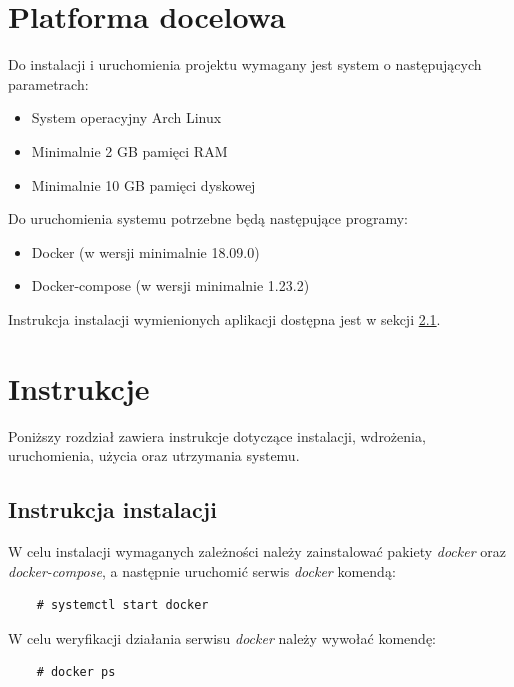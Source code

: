 \documentclass[a4paper,11pt,twoside]{report}
\theoremstyle{definition}
\begin{document}
    \section{Platforma docelowa}
        Do instalacji i uruchomienia projektu wymagany jest system o następujących parametrach:
        
        \begin{itemize}
            \item System operacyjny Arch Linux 
            \item Minimalnie 2 GB pamięci RAM
            \item Minimalnie 10 GB pamięci dyskowej
        \end{itemize}
        
        Do uruchomienia systemu potrzebne będą następujące programy:
        
        \begin{itemize}
            \item Docker (w wersji minimalnie 18.09.0)
            \item Docker-compose (w wersji minimalnie 1.23.2)
        \end{itemize}
    
        Instrukcja instalacji wymienionych aplikacji dostępna jest w sekcji \ref{installation-instruction}.
    
    \section{Instrukcje}
        Poniższy rozdział zawiera instrukcje dotyczące instalacji, wdrożenia, uruchomienia, użycia oraz utrzymania systemu.
    
    \subsection{Instrukcja instalacji}
        \label{installation-instruction}
        W celu instalacji wymaganych zależności należy zainstalować pakiety \textit{docker} oraz \textit{docker-compose}, a następnie uruchomić serwis \textit{docker} komendą:

        \begin{verbatim}
    # systemctl start docker
        \end{verbatim}

        W celu weryfikacji działania serwisu \textit{docker} należy wywołać komendę:
        \begin{verbatim}
    # docker ps
        \end{verbatim}
\end{document}

